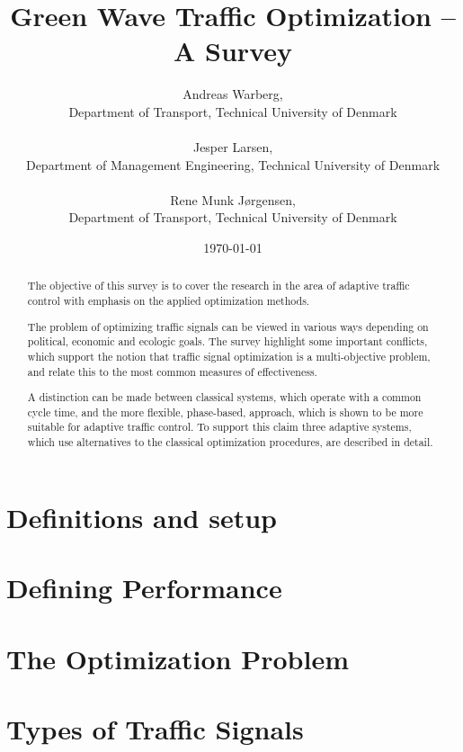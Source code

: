 \documentclass [a4paper, 10pt]{article}
\title{Green Wave Traffic Optimization -- A Survey}
\author{Andreas Warberg,\\ Department of Transport, Technical University of Denmark\\ ~ \\ 
Jesper Larsen,\\ Department of Management Engineering, Technical University of Denmark\\ ~ \\ Rene Munk J{\o}rgensen,\\ Department of Transport, Technical University of Denmark}
\date{\today}
\begin{document}
\setlength{\parindent}{4mm}

\maketitle

\begin{abstract}
The objective of this survey is to cover the research in the area of
adaptive traffic control with emphasis on the applied optimization
methods.

The problem of optimizing traffic signals can be viewed in various
ways depending on political, economic and ecologic goals. The survey
highlight some important conflicts, which support the notion that
traffic signal optimization is a multi-objective problem, and relate
this to the most common measures of effectiveness.

A distinction can be made between classical systems, which operate
with a common cycle time, and the more flexible, phase-based,
approach, which is shown to be more suitable for adaptive traffic
control. To support this claim three adaptive systems, which use alternatives to the classical optimization procedures, are described in detail.
\end{abstract}



\section{Definitions and setup}


%

\section{Defining Performance}


\section{The Optimization Problem}


\section{Types of Traffic Signals}

\end{document}

